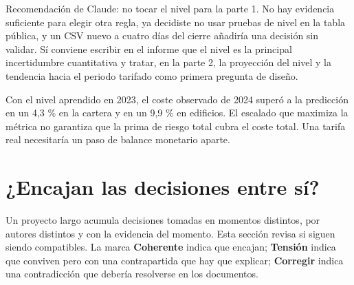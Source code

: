 \documentclass[11pt,a4paper]{article}
\newcommand{\ok}{\textcolor{verde}{\sffamily\small\bfseries Coherente}}
\newcommand{\tension}{\textcolor{ambar}{\sffamily\small\bfseries Tensión}}
\newcommand{\corregir}{\textcolor{rojo}{\sffamily\small\bfseries Corregir}}
\begin{document}
\begin{pendiente}[P7 · nivel de 2025]
Recomendación de Claude: no tocar el nivel para la parte 1. No hay evidencia suficiente para elegir otra regla, ya decidiste no usar pruebas de nivel en la tabla pública, y un CSV nuevo a cuatro días del cierre añadiría una decisión sin validar. Sí conviene escribir en el informe que el nivel es la principal incertidumbre cuantitativa y tratar, en la parte 2, la proyección del nivel y la tendencia hacia el periodo tarifado como primera pregunta de diseño.
\end{pendiente}

\begin{cuidado}
Con el nivel aprendido en 2023, el coste observado de 2024 superó a la predicción en un 4,3 \% en la cartera y en un 9,9 \% en edificios. El escalado que maximiza la métrica no garantiza que la prima de riesgo total cubra el coste total. Una tarifa real necesitaría un paso de balance monetario aparte.
\end{cuidado}

\section{¿Encajan las decisiones entre sí?}

Un proyecto largo acumula decisiones tomadas en momentos distintos, por autores distintos y con la evidencia del momento. Esta sección revisa si siguen siendo compatibles. La marca \ok{} indica que encajan; \tension{} indica que conviven pero con una contrapartida que hay que explicar; \corregir{} indica una contradicción que debería resolverse en los documentos.
\end{document}

